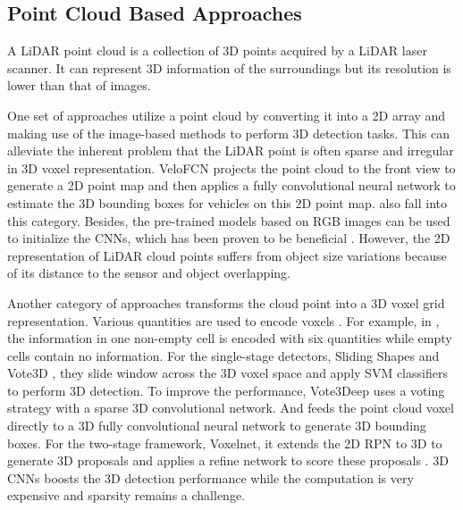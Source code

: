 \documentclass[a4paper,12pt]{article}
\begin{document}
\subsection{Point Cloud Based Approaches}

A LiDAR point cloud is a collection of 3D points acquired by a LiDAR laser scanner. It can represent 3D information of the surroundings but its resolution is lower than that of images.

One set of approaches utilize a point cloud by converting it into a 2D array and making use of the image-based methods to perform 3D detection tasks. This can alleviate the inherent problem that the LiDAR point is often sparse and irregular in 3D voxel representation. VeloFCN \cite{DBLP:journals/corr/LiZX16} projects the point cloud to the front view to generate a 2D point map and then applies a fully convolutional neural network to estimate the 3D bounding boxes for vehicles on this 2D point map. \cite{DBLP:journals/corr/abs-1710-07368, Chen:2015:OPA:2969239.2969287} also fall into this category. Besides, the pre-trained models based on RGB images can be used to initialize the CNNs, which has been proven to be beneficial \cite{DBLP:journals/corr/GuptaGAM14}. However, the 2D representation of LiDAR cloud points suffers from object size variations because of its distance to the sensor and object overlapping.

Another category of approaches transforms the cloud point into a 3D voxel grid representation. Various quantities are used to encode voxels \cite{10.1007/978-3-319-10599-4_41, 7780463, DBLP:journals/corr/Li16p, Wang-RSS-15, DBLP:journals/corr/EngelckeRWTP16}. For example, in \cite{Wang-RSS-15, DBLP:journals/corr/EngelckeRWTP16}, the information in one non-empty cell is encoded with six quantities while empty cells contain no information. For the single-stage detectors, \eg Sliding Shapes \cite{10.1007/978-3-319-10599-4_41} and Vote3D \cite{Wang-RSS-15}, they slide window across the 3D voxel space and apply SVM classifiers to perform 3D detection. To improve the performance, Vote3Deep \cite{DBLP:journals/corr/EngelckeRWTP16} uses a voting strategy with a sparse 3D convolutional network. And \cite{DBLP:journals/corr/Li16p} feeds the point cloud voxel directly to a 3D fully convolutional neural network to generate 3D bounding boxes. For the two-stage framework, \eg Voxelnet, it extends the 2D RPN \cite{DBLP:journals/corr/RenHG015} to 3D to generate 3D proposals and  applies a refine network to score these proposals \cite{DBLP:journals/corr/abs-1711-06396}. 3D CNNs boosts the 3D detection performance while the computation is very expensive and sparsity remains a challenge.  
\end{document}
